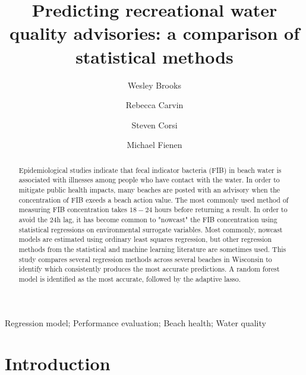 \documentclass[authoryear,review, 12pt]{elsarticle}
\date{}
\begin{document}
\begin{frontmatter}

\title{Predicting recreational water quality advisories: a comparison of statistical methods}

\author[usgs-wiwsc]{Wesley Brooks}

\author[usgs-wiwsc]{Rebecca Carvin}

\author[usgs-wiwsc]{Steven Corsi}

\author[usgs-wiwsc]{Michael Fienen}

\address[usgs-wiwsc]{Wisconsin Water Science Center, United States Geological Survey, 8505 Research Way, Middleton, WI 53562}

\begin{abstract}
Epidemiological studies indicate that fecal indicator bacteria (FIB) in beach water is associated with illnesses among people who have contact with the water. In order to mitigate public health impacts, many beaches are posted with an advisory when the concentration of FIB exeeds a beach action value. The most commonly used method of measuring FIB concentration takes $18 - 24$ hours before returning a result. In order to avoid the $24$h lag, it has become common to "nowcast" the FIB concentration using statistical regressions on environmental surrogate variables. Most commonly, nowcast models are estimated using ordinary least squares regression, but other regression methods from the statistical and machine learning literature are sometimes used. This study compares several regression methods across several beaches in Wisconsin to identify which consistently produces the most accurate predictions. A random forest model is identified as the most accurate, followed by the adaptive lasso.
\end{abstract}

\begin{keyword}
Regression model; Performance evaluation; Beach health; Water quality
\end{keyword}

\end{frontmatter}


\section{Introduction}\label{introduction}
\end{document}
